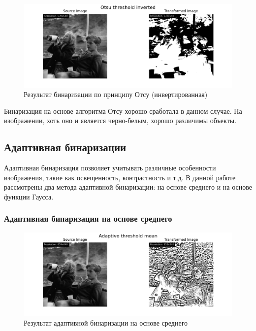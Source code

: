 \begin{figure}[ht!]
    \centering
    \includegraphics[width=\textwidth]{../results/Otsu threshold inverted.png}
    \caption{Результат бинаризации по принципу Отсу (инвертированная)}
    \label{img:otsu_threshold_inv}
\end{figure}

Бинаризация на основе алгоритма Отсу хорошо сработала в данном случае. На изображении, хоть оно и является черно-белым, хорошо различимы объекты.

\FloatBarrier
\subsection{Адаптивная бинаризации}

Адаптивная бинаризация позволяет учитывать различные особенности изображения, такие как освещенность, контрастность и т.д. В данной работе рассмотрены два метода адаптивной бинаризации: на основе среднего и на основе функции Гаусса.

\subsubsection{Адаптивная бинаризация на основе среднего}

\begin{figure}[ht!]
    \centering
    \includegraphics[width=\textwidth]{../results/Adaptive threshold mean.png}
    \caption{Результат адаптивной бинаризации на основе среднего}
    \label{img:adaptive_mean}
\end{figure}

